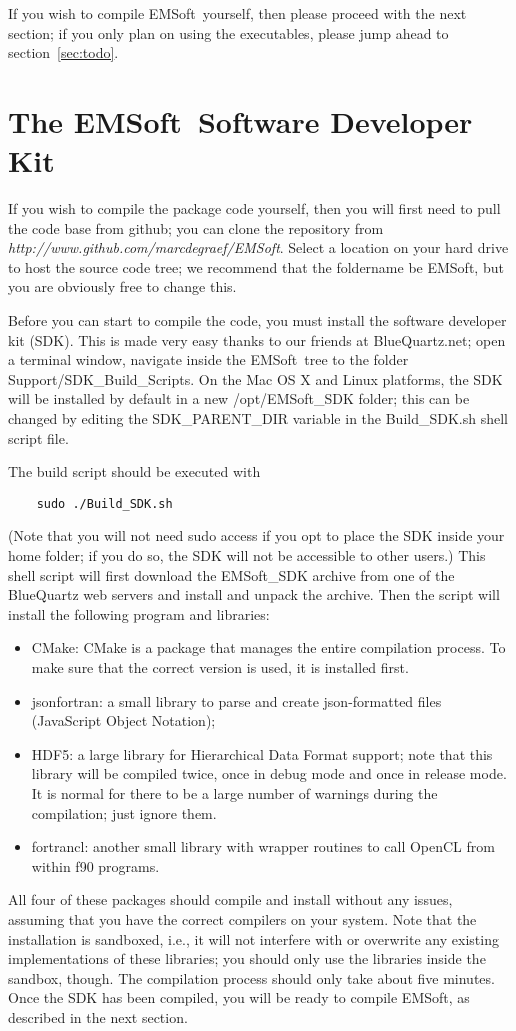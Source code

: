 \documentclass[DIV=calc, paper=letter, fontsize=11pt]{scrartcl}	 %
\newcommand{\ctp}{\textsf{EMSoft}}
\newcommand{\ctpb}{\textbf{\textsf{EMSoft}}}
\begin{document}
If you wish to compile \ctp\ yourself, then please proceed with the next section; if you only plan on using the 
executables, please jump ahead to section~\ref{sec:todo}.


\section{The \ctpb\ Software Developer Kit\label{sec:SDK}}
If you wish to compile the package code yourself, then you will first need to pull the code base from github; you can 
clone the repository from \textit{http://www.github.com/marcdegraef/EMSoft}.  Select a location on your hard drive to 
host the source code tree; we recommend that the foldername be \ctp, but you are obviously free to change this.

Before you can start to compile the code, you must install the software developer kit (SDK).  This is made very easy thanks to our
friends at BlueQuartz.net; open a terminal window, navigate inside the \ctp\ tree to the folder \textsf{Support/SDK\_Build\_Scripts}.
On the Mac OS X and Linux platforms, the SDK will be installed by default in a new \textsf{/opt/EMSoft\_SDK}
folder; this can be changed by editing the \textsf{SDK\_PARENT\_DIR} variable in the \textsf{Build\_SDK.sh} shell script file.

The build script should be executed with
\begin{verbatim}
	sudo ./Build_SDK.sh
\end{verbatim}
(Note that you will not need sudo access if you opt to place the SDK inside your home folder; if you do so, the SDK will not be accessible
to other users.) This shell script will first download the \textsf{EMSoft\_SDK} archive from one of the BlueQuartz web servers and install
and unpack the archive. Then the script will install the following program and libraries:
\begin{itemize}
\item \textsf{CMake}: CMake is a package that manages the entire compilation process.  To make sure that the correct version is used, it is installed first.
\item \textsf{jsonfortran}: a small library to parse and create json-formatted files (JavaScript Object Notation);
\item \textsf{HDF5}: a large library for Hierarchical Data Format support; note that this library will be compiled twice, once in debug mode and once in release mode.
It is normal for there to be a large number of warnings during the compilation; just ignore them.
\item \textsf{fortrancl}: another small library with wrapper routines to call OpenCL from within f90 programs.
\end{itemize}
All four of these packages should compile and install without any issues, assuming that you have the correct compilers on your system.  Note that the 
installation is sandboxed, i.e., it will not interfere with or overwrite any existing implementations of these libraries;  you should only use the libraries
inside the sandbox, though.  The compilation process should only take about five minutes.  Once the SDK has been compiled, you will be ready to compile \ctp, 
as described in the next section.
\end{document}
